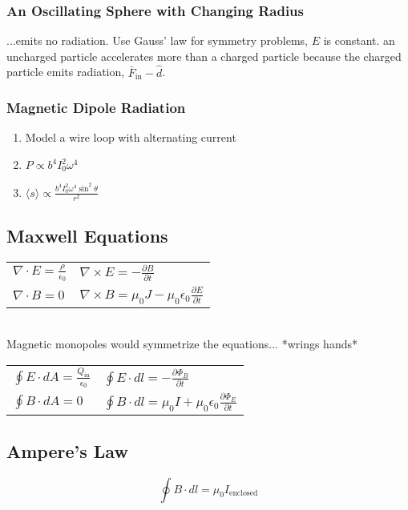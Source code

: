 \documentclass[10pt,letter]{article}
\begin{document}
\subsubsection{An Oscillating Sphere with Changing Radius}
...emits no radiation. Use Gauss' law for symmetry problems, $E$ is constant. an uncharged particle accelerates more than a charged particle because the charged particle emits radiation, $\bar{F}_{\textrm{in}} -\hat{d}$.

\subsubsection{Magnetic Dipole Radiation}
\begin{enumerate}
    \item Model a wire loop with alternating current
    \item $P \propto b^4 I_0^2 \omega^4$
    \item $\langle s \rangle \propto \frac{b^4 I_0^2 \omega^4 \sin^2 \theta}{r^2}$
\end{enumerate}

\subsection{Maxwell Equations}
\begin{tabular}{l l}
$\nabla \cdot E = \frac{\rho}{\epsilon_0}$ & $\nabla \times E = - \frac{\partial B}{\partial t }$\\
$\nabla \cdot B = 0$ & $\nabla \times B = \mu_0J-\mu_0\epsilon_0 \frac{\partial E}{\partial t}$
\end{tabular}\\
Magnetic monopoles would symmetrize the equations... *wrings hands*\\

\begin{tabular}{l l}
$\oint E \cdot dA = \frac{Q_{\textrm{in}}}{\epsilon_0}$ & $\oint E \cdot dl = - \frac{\partial \Phi_B}{\partial t}$\\
$\oint B \cdot dA = 0$ & $\oint B \cdot dl = \mu_0 I + \mu_0 \epsilon_0 \frac{\partial \Phi_E}{\partial t}$
\end{tabular}

\subsection{Ampere's Law}
\begin{equation}
 \oint B \cdot dl = \mu_0 I_{\textrm{enclosed}} 
\end{equation}
\end{document}
